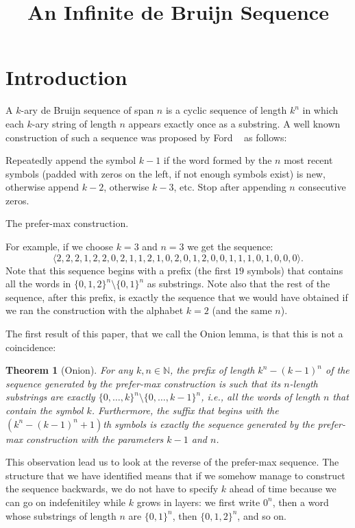 \documentclass{article}
\title{An Infinite de Bruijn Sequence}
\author{}
\newtheorem{theorem}{Theorem}
\theoremstyle{definition}
\newcommand{\N}{{\mathbb{N}}}
\begin{document}
\maketitle

\section{Introduction}

A $k$-ary de Bruijn sequence of span $n$ is a cyclic sequence of length $k^n$ in which each $k$-ary string of length $n$ appears exactly once as
a substring. A well known construction of such a sequence was proposed by Ford ~\cite{Ford57} as follows:

\begin{algorithm}
Repeatedly append the symbol $k-1$ if the word formed by the $n$ most recent symbols (padded with zeros on the left, if not enough symbols exist) is new, otherwise append $k-2$, otherwise $k-3$, etc. Stop after appending $n$ consecutive zeros. 
\caption{The prefer-max construction.}
\end{algorithm}


For example, if we choose $k=3$ and $n=3$ we get the sequence:
$$\langle2,2,2,1,2,2,0,2,1,1,2,1,0,2,0,1,2,0,0,1,1,1,0,1,0,0,0\rangle.$$
Note that this sequence begins with a prefix (the first $19$ symbols) that contains all the words in $\{0,1,2\}^n \setminus \{0,1\}^n$ as substrings. Note also that the rest of the sequence, after this prefix, is exactly the sequence that we would have obtained if we ran the construction with the alphabet $k=2$ (and the same $n$). 

The first result of this paper, that we call the Onion lemma, is that this is not a coincidence:

\begin{theorem}[Onion]
	For any $k,n \in \N$, the prefix of length $k^n-(k-1)^n$ of the sequence generated by the prefer-max construction is such that its $n$-length substrings are exactly $\{0,\dots,k\}^n \setminus \{0,\dots,k-1\}^n$, i.e., all the words of length $n$ that contain the symbol $k$. Furthermore, the suffix that begins with the 
	$(k^n-(k-1)^n+1)$th symbols is exactly the sequence generated by the prefer-max construction with the parameters $k-1$ and $n$.
\end{theorem}

This observation lead us to look at the reverse of the prefer-max sequence. The structure that we have identified means that if we somehow manage to construct the sequence backwards, we do not have to specify $k$ ahead of time because we can go on indefenitiley while $k$ grows in layers: we first write $0^n$, then a word whose substrings of length $n$ are $\{0,1\}^n$, then $\{0,1,2\}^n$, and so on.
\end{document}
